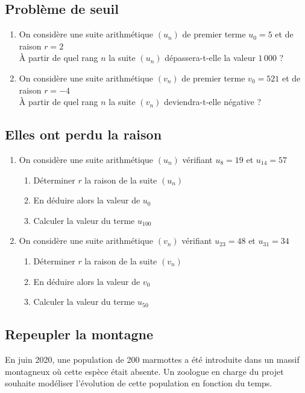 \documentclass[oneside,12pt]{article}          %
\begin{document}
\subsection{Problème de seuil}
\begin{enumerate}
	\item On considère une suite arithmétique $(u_n)$ de premier terme $u_0 = 5$ et de raison $r = 2$ \\
	À partir de quel rang $n$ la suite $(u_n)$ dépassera-t-elle la valeur $1\,000$ ?
	\item On considère une suite arithmétique $(v_n)$ de premier terme $v_0 = 521$ et de raison $r = -4$ \\
	À partir de quel rang $n$ la suite $(v_n)$ deviendra-t-elle négative ?
\end{enumerate}



\subsection{Elles ont perdu la raison}
\begin{enumerate}
	\item On considère une suite arithmétique $(u_n)$ vérifiant $u_8 = 19$ et $u_{14} = 57$
	\begin{enumerate}
		\item Déterminer $r$ la raison de la suite $(u_n)$
		\item En déduire alors la valeur de $u_0$
		\item Calculer la valeur du terme $u_{100}$
	\end{enumerate}
	\item On considère une suite arithmétique $(v_n)$ vérifiant $u_{23} = 48$ et $u_{31} = 34$
	\begin{enumerate}
		\item Déterminer $r$ la raison de la suite $(v_n)$
		\item En déduire alors la valeur de $v_0$
		\item Calculer la valeur du terme $u_{50}$
	\end{enumerate}
\end{enumerate}


\subsection{Repeupler la montagne}
En juin 2020, une population de 200 marmottes a été introduite dans un massif montagneux où cette espèce était absente. Un zoologue en charge du projet souhaite modéliser l’évolution de cette population en fonction du temps.
\end{document}
